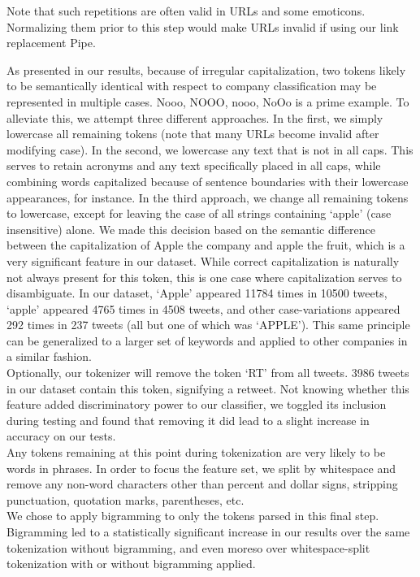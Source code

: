 \documentclass[letterpaper]{article}
\begin{document}
Note that such repetitions are often valid in URLs and some emoticons. Normalizing them prior to this step would make URLs invalid if using our link replacement Pipe.

As presented in our results, because of irregular capitalization, two tokens likely to be semantically identical with respect to company classification may be represented in multiple cases. {Nooo, NOOO, nooo, NoOo} is a prime example. To alleviate this, we attempt three different approaches. In the first, we simply lowercase all remaining tokens (note that many URLs become invalid after modifying case). In the second, we lowercase any text that is not in all caps. This serves to retain acronyms and any text specifically placed in all caps, while combining words capitalized because of sentence boundaries with their lowercase appearances, for instance. In the third approach, we change all remaining tokens to lowercase, except for leaving the case of all strings containing `apple' (case insensitive) alone. We made this decision based on the semantic difference between the capitalization of Apple the company and apple the fruit, which is a very significant feature in our dataset. While correct capitalization is naturally not always present for this token, this is one case where capitalization serves to disambiguate. In our dataset, `Apple' appeared 11784 times in 10500 tweets, `apple' appeared 4765 times in 4508 tweets, and other case-variations appeared 292 times in 237 tweets (all but one of which was `APPLE'). This same principle can be generalized to a larger set of keywords and applied to other companies in a similar fashion. \\

Optionally, our tokenizer will remove the token `RT' from all tweets. 3986 tweets in our dataset contain this token, signifying a retweet. Not knowing whether this feature added discriminatory power to our classifier, we toggled its inclusion during testing and found that removing it did lead to a slight increase in accuracy on our tests.\\

Any tokens remaining at this point during tokenization are very likely to be words in phrases. In order to focus the feature set, we split by whitespace and remove any non-word characters other than percent and dollar signs, stripping punctuation, quotation marks, parentheses, etc. \\

We chose to apply bigramming to only the tokens parsed in this final step. Bigramming led to a statistically significant increase in our results over the same tokenization without bigramming, and even moreso over whitespace-split tokenization with or without bigramming applied.
\end{document}
